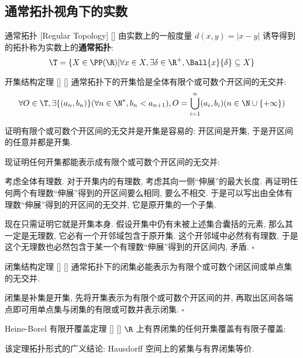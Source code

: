 \documentclass[UTF8]{ctexart}
\begin{document}
		\subsection{通常拓扑视角下的实数}
			
			\begin{dfn}
			    []
			    {通常拓扑 }
			    [Regular Topology]
			    []
				由实数上的一般度量 \(d(x,y)=|x-y|\) 诱导得到的拓扑称为实数上的\textbf{通常拓扑}: 
				\[\T=\{X\in\PP(\R)|\forall x\in X, \exists\delta\in\R^+, \Ball{x}{\delta}\subseteq X\}\]
			\end{dfn}
			
			\begin{thm}
			    []
			    {开集结构定理}
			    []
			    []
				通常拓扑下的开集恰是全体有限个或可数个开区间的无交并: 
				\[\forall O\in \T, \exists\{(a_n,b_n)\}(\forall n\in\N^*, b_n<a_{n+1}), O=\bigcup_{i=1}^n(a_i,b_i)(n\in\N\cup\{+\infty\})\]
			\end{thm}
			
			\begin{prf}
				证明有限个或可数个开区间的无交并是开集是容易的: 开区间是开集, 于是开区间的任意并都是开集. 

				现证明任何开集都能表示成有限个或可数个开区间的无交并: 

				考虑全体有理数. 对于开集内的有理数, 考虑其向一侧``伸展''的最大长度. 再证明任何两个有理数``伸展''得到的开区间要么相同, 要么不相交. 于是可以写出由全体有理数``伸展''得到的开区间的无交并, 它是原开集的一个子集. 
				
				现在只需证明它就是开集本身. 假设开集中仍有未被上述集合囊括的元素, 那么其一定是无理数, 它必有一个开邻域包含于原开集. 这个开邻域中必然有有理数, 于是这个无理数也必然包含于某一个有理数``伸展''得到的开区间内, 矛盾. \(\square\)
			\end{prf}
			
			\begin{crl}
			    []
			    {闭集结构定理}
			    []
			    []
				通常拓扑下的闭集必能表示为有限个或可数个闭区间或单点集的无交并. 
			\end{crl}
			
			\begin{prf}
				闭集是补集是开集, 先将开集表示为有限个或可数个开区间的并, 再取出区间各端点即可用单点集与闭集的有限或可数并表示闭集. \(\square\)
			\end{prf}
				
			\begin{thm}
			    []
			    {Heine-Borel 有限开覆盖定理}
			    []
			    []
				\(\R\) 上有界闭集的任何开集覆盖有有限子覆盖: 
				\[\]

				该定理拓扑形式的广义结论: Hausdorff 空间上的紧集与有界闭集等价. 
			\end{thm}
		
\end{document}
